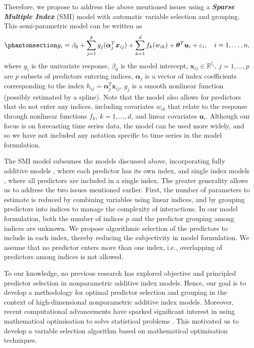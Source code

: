 \documentclass[
  11pt,
  a4paper,
]{article}
\begin{document}
Therefore, we propose to address the above mentioned issues using a
\textbf{\emph{Sparse Multiple Index}} (SMI) model with automatic
variable selection and grouping. This semi-parametric model can be
written as \begin{equation}\phantomsection\label{eq-semipara}{
  y_{i} = \beta_{0} + \sum_{j = 1}^{p}g_{j}(\bm{\alpha}_{j}^{T}\bm{x}_{ij}) + \sum_{k = 1}^{d}f_{k}(w_{ik}) + \bm{\theta}^{T}\bm{u}_{i} + \varepsilon_{i}, \quad i = 1, \dots, n,
}\end{equation} where \(y_{i}\) is the univariate response,
\(\beta_{0}\) is the model intercept,
\(\bm{x}_{ij} \in \mathbb{R}^{l_{j}}\), \(j = 1, \dots, p\) are \(p\)
subsets of predictors entering indices, \(\bm{\alpha}_{j}\) is a vector
of index coefficients corresponding to the index
\(h_{ij} = \bm{\alpha}_{j}^{T}\bm{x}_{ij}\), \(g_{j}\) is a smooth
nonlinear function (possibly estimated by a spline). Note that the model
also allows for predictors that do not enter any indices, including
covariates \(w_{ik}\) that relate to the response through nonlinear
functions \(f_{k}\), \(k = 1, \dots, d\), and linear covariates
\(\bm{u}_{i}\). Although our focus is on forecasting time series data,
the model can be used more widely, and so we have not included any
notation specific to time series in the model formulation.

The SMI model subsumes the models discussed above, incorporating fully
additive models \autocite{Wood2011,Wood2017}, where each predictor has
its own index, and single index models
\autocite{Stoker1986,Hardle1993,Radchenko2015}, where all predictors are
included in a single index. The greater generality allows us to address
the two issues mentioned earlier. First, the number of parameters to
estimate is reduced by combining variables using linear indices, and by
grouping predictors into indices to manage the complexity of
interactions. In our model formulation, both the number of indices \(p\)
and the predictor grouping among indices are unknown. We propose
algorithmic selection of the predictors to include in each index,
thereby reducing the subjectivity in model formulation. We assume that
no predictor enters more than one index, i.e., overlapping of predictors
among indices is not allowed.

To our knowledge, no previous research has explored objective and
principled predictor selection in nonparametric additive index models.
Hence, our goal is to develop a methodology for optimal predictor
selection and grouping in the context of high-dimensional nonparametric
additive index models. Moreover, recent computational advancements have
sparked significant interest in using mathematical optimisation to solve
statistical problems \autocite{Theusl2020}. This motivated us to develop
a variable selection algorithm based on mathematical optimisation
techniques.
\end{document}
